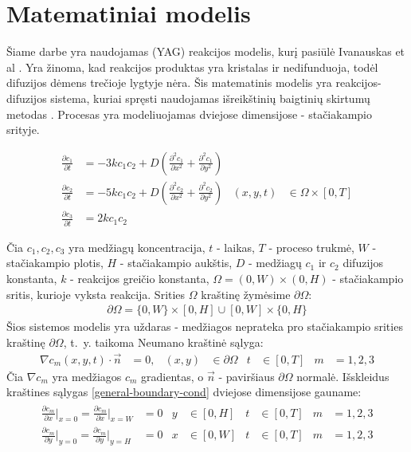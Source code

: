 
\section{Matematiniai modelis}

Šiame darbe yra naudojamas (YAG) reakcijos modelis, kurį pasiūlė Ivanauskas et al \cite{ivanauskasModellingSolidState2005}. Yra žinoma, kad reakcijos produktas yra kristalas ir nedifunduoja, todėl difuzijos dėmens trečioje lygtyje nėra. Šis matematinis modelis yra reakcijos-difuzijos sistema, kuriai spręsti naudojamas išreikštinių baigtinių skirtumų metodas \cite{pressNumericalRecipes3rd2007}. Procesas yra modeliuojamas dviejose dimensijose - stačiakampio srityje.

\begin{subequations} \label{rect}
	\begin{align}
		\frac{\partial c_1}{\partial t} & =-3kc_1c_2+D\left(\frac{\partial^2c_1}{\partial x^2}+\frac{\partial^2c_1}{\partial y^2}\right) \\
		\frac{\partial c_2}{\partial t} & =-5kc_1c_2+D\left(\frac{\partial^2c_2}{\partial x^2}+\frac{\partial^2c_2}{\partial y^2}\right) & (x, y, t)&\in\Omega\times[0, T]\\
		\frac{\partial c_3}{\partial t} & =2kc_1c_2
	\end{align}
\end{subequations}

Čia $c_1,c_2,c_3$ yra medžiagų koncentracija, $t$ - laikas, $T$ - proceso trukmė, $W$ - stačiakampio plotis, $H$ - stačiakampio aukštis,
$D$ - medžiagų $c_1$ ir $c_2$ difuzijos konstanta, $k$ - reakcijos greičio konstanta, $\Omega=(0, W)\times(0, H)$ - stačiakampio sritis, kurioje vyksta reakcija. Srities $\Omega$ kraštinę žymėsime $\partial\Omega$:
\begin{align*}
    \partial\Omega=\{0, W\}\times[0, H]\cup[0, W]\times\{0, H\}
\end{align*}
Šios sistemos modelis yra uždaras - medžiagos neprateka pro stačiakampio srities kraštinę $\partial\Omega$, t.~y. taikoma Neumano kraštinė sąlyga:
\begin{align} \label{general-boundary-cond}
	\nabla c_m(x, y, t)\cdot\vec{n}&=0, & (x, y)&\in\partial\Omega & t&\in[0, T] & m&=1, 2, 3
\end{align}
Čia $\nabla c_m$ yra medžiagos $c_m$ gradientas, o $\vec{n}$ - paviršiaus $\partial\Omega$ normalė. Išskleidus kraštines sąlygas \eqref{general-boundary-cond} dviejose dimensijose gauname:
\begin{equation} \label{boundary-cond}
\begin{aligned}
\begin{split}
    \frac{\partial c_m}{\partial x}\Big|_{x=0}=\frac{\partial c_m}{\partial x}\Big|_{x=W}&=0 & y&\in[0,H] & t&\in[0, T] & m&=1, 2, 3\\
    \frac{\partial c_m}{\partial y}\Big|_{y=0}=\frac{\partial c_m}{\partial y}\Big|_{y=H}&=0 & x&\in[0,W] & t&\in[0, T] & m&=1, 2, 3
\end{split}
\end{aligned}
\end{equation}

